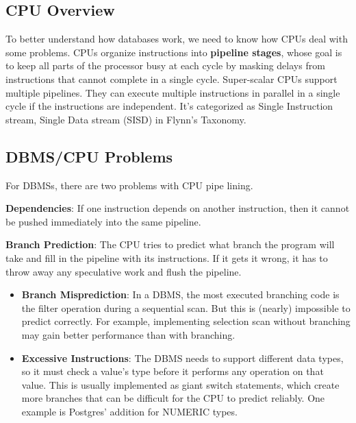 \documentclass[11pt]{article}
\begin{document}
\subsection*{CPU Overview}
To better understand how databases work, we need to know how CPUs deal with some problems. CPUs organize instructions into \textbf{pipeline stages}, whose goal is to keep all parts of the processor busy at each cycle by masking delays from instructions that cannot complete in a single cycle. Super-scalar CPUs support multiple pipelines. They can execute multiple instructions in parallel in a single cycle if the instructions are independent. It's categorized as Single Instruction stream, Single Data stream (SISD) in Flynn's Taxonomy.

\subsection*{DBMS/CPU Problems}
For DBMSs, there are two problems with CPU pipe lining. 

\textbf{Dependencies}: If one instruction depends on another instruction, then it cannot be pushed immediately into the same pipeline. 

\textbf{Branch Prediction}: The CPU tries to predict what branch the program will take and fill in the pipeline with its instructions. If it gets it wrong, it has to throw away any speculative work and flush the pipeline. 
\begin{itemize}
    \item \textbf{Branch Misprediction}: In a DBMS, the most executed branching code is the filter operation during a sequential scan. But this is (nearly) impossible to predict correctly. For example, implementing selection scan without branching may gain better performance than with branching.
    \item \textbf{Excessive Instructions}: The DBMS needs to support different data types, so it must check a value's type before it performs any operation on that value. This is usually implemented as giant switch statements, which create more branches that can be difficult for the CPU to predict reliably. One example is Postgres' addition for NUMERIC types.
\end{itemize}

\end{document}
